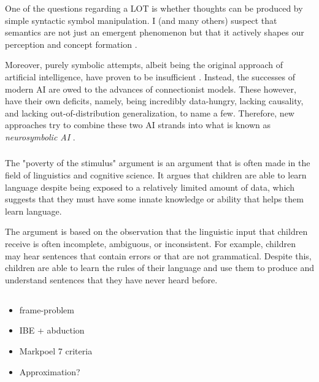 One of the questions regarding a LOT is whether thoughts can be produced by simple syntactic symbol manipulation.
I (and many others) suspect that semantics are not just an emergent phenomenon but that it actively shapes our perception and concept formation \cite{santoro2021symbolic, hofstadter_gdel_1979}.

Moreover, purely symbolic attempts, albeit being the original approach of artificial intelligence, have proven to be insufficient \cite{garcez2020neurosymbolic}. Instead, the successes of modern AI are owed to the advances of connectionist models. These however, have their own deficits, namely, being incredibly data-hungry, lacking causality, and lacking out-of-distribution generalization, to name a few. Therefore, new approaches try to combine these two AI strands into what is known as \emph{neurosymbolic AI} \cite{garcez2020neurosymbolic}.




\subsubsection{}

The "poverty of the stimulus" argument is an argument that is often made in the field of linguistics and cognitive science. It argues that children are able to learn language despite being exposed to a relatively limited amount of data, which suggests that they must have some innate knowledge or ability that helps them learn language.

The argument is based on the observation that the linguistic input that children receive is often incomplete, ambiguous, or inconsistent. For example, children may hear sentences that contain errors or that are not grammatical. Despite this, children are able to learn the rules of their language and use them to produce and understand sentences that they have never heard before.




\subsection{}
\begin{itemize}
    \item frame-problem
    \item IBE + abduction
    \item Markpoel 7 criteria
    \item Approximation?
\end{itemize}

